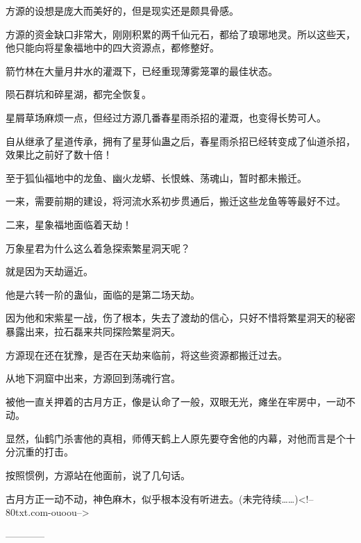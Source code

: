 \begin{this_body}
方源的设想是庞大而美好的，但是现实还是颇具骨感。

方源的资金缺口非常大，刚刚积累的两千仙元石，都给了琅琊地灵。所以这些天，他只能向将星象福地中的四大资源点，都修整好。

箭竹林在大量月井水的灌溉下，已经重现薄雾笼罩的最佳状态。

陨石群坑和碎星湖，都完全恢复。

星屑草场麻烦一点，但经过方源几番春星雨杀招的灌溉，也变得长势可人。

自从继承了星道传承，拥有了星芽仙蛊之后，春星雨杀招已经转变成了仙道杀招，效果比之前好了数十倍！

至于狐仙福地中的龙鱼、幽火龙蟒、长恨蛛、荡魂山，暂时都未搬迁。

一来，需要前期的建设，将河流水系初步贯通后，搬迁这些龙鱼等等最好不过。

二来，星象福地面临着天劫！

万象星君为什么这么着急探索繁星洞天呢？

就是因为天劫逼近。

他是六转一阶的蛊仙，面临的是第二场天劫。

因为他和宋紫星一战，伤了根本，失去了渡劫的信心，只好不惜将繁星洞天的秘密暴露出来，拉石磊来共同探险繁星洞天。

方源现在还在犹豫，是否在天劫来临前，将这些资源都搬迁过去。

从地下洞窟中出来，方源回到荡魂行宫。

被他一直关押着的古月方正，像是认命了一般，双眼无光，瘫坐在牢房中，一动不动。

显然，仙鹤门杀害他的真相，师傅天鹤上人原先要夺舍他的内幕，对他而言是个十分沉重的打击。

按照惯例，方源站在他面前，说了几句话。

古月方正一动不动，神色麻木，似乎根本没有听进去。(未完待续……)<!--80txt.com-ouoou-->

------------

\end{this_body}

